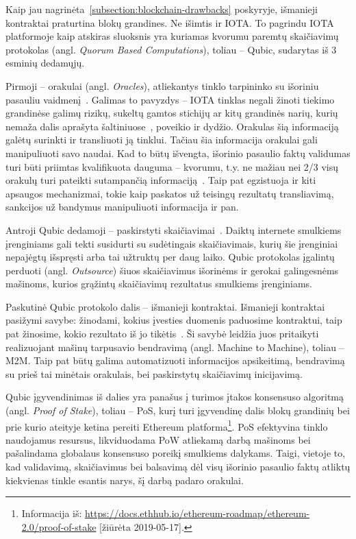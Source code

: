  \label{subsection:dag-qubic}

Kaip jau nagrinėta~\ref{subsection:blockchain-drawbacks} poskyryje, išmanieji kontraktai praturtina blokų grandines. Ne išimtis ir IOTA. To pagrindu IOTA platformoje kaip atskiras sluoksnis yra kuriamas kvorumu paremtų skaičiavimų protokolas (angl. \textit{Quorum Based Computations}), toliau – Qubic, sudarytas iš 3 esminių dedamųjų.

Pirmoji – orakulai (angl. \textit{Oracles}), atliekantys tinklo tarpininko su išoriniu pasauliu vaidmenį~\cite{iota2017oracles}. Galimas to pavyzdys – IOTA tinklas negali žinoti tiekimo grandinėse galimų rizikų, sukeltų gamtos stichijų ar kitų grandinės narių, kurių nemaža dalis aprašyta šaltiniuose~\cite{behdani2012handle, strom2013pwc}, poveikio ir dydžio. Orakulas šią informaciją galėtų surinkti ir transliuoti ją tinklui. Tačiau šia informacija orakulai gali manipuliuoti savo naudai. Kad to būtų išvengta, išorinio pasaulio faktų validumas turi būti priimtas kvalifikuota dauguma – kvorumu, t.y. ne mažiau nei 2/3 visų orakulų turi pateikti sutampančią informaciją~\cite{iota2017oracles}. Taip pat egzistuoja ir kiti apsaugos mechanizmai, tokie kaip paskatos už teisingų rezultatų transliavimą, sankcijos už bandymus manipuliuoti informacija ir pan.

Antroji Qubic dedamoji – paskirstyti skaičiavimai~\cite{iota2017oracles}. Daiktų internete smulkiems įrenginiams gali tekti susidurti su sudėtingais skaičiavimais, kurių šie įrenginiai nepajėgtų išspręsti arba tai užtruktų per daug laiko. Qubic protokolas įgalintų perduoti (angl. \textit{Outsource}) šiuos skaičiavimus išorinėms ir gerokai galingesnėms mašinoms, kurios grąžintų skaičiavimų rezultatus smulkiems įrenginiams.

Paskutinė Qubic protokolo dalis – išmanieji kontraktai. Išmanieji kontraktai pasižymi savybe: žinodami, kokius įvesties duomenis paduosime kontraktui, taip pat žinosime, kokio rezultato iš jo tikėtis~\cite{iota2017oracles}. Ši savybė leidžia juos pritaikyti realizuojant mašinų tarpusavio bendravimą (angl. Machine to Machine), toliau – M2M. Taip pat būtų galima automatizuoti informacijos apsikeitimą, bendravimą su prieš tai minėtais orakulais, bei paskirstytų skaičiavimų inicijavimą.

Qubic įgyvendinimas iš dalies yra panašus į turimos įtakos konsensuso algoritmą (angl. \textit{Proof of Stake}), toliau – PoS, kurį turi įgyvendinę dalis blokų grandinių bei prie kurio ateityje ketina pereiti Ethereum platforma\footnote{Informacija iš: \href{https://docs.ethhub.io/ethereum-roadmap/ethereum-2.0/proof-of-stake}{https://docs.ethhub.io/ethereum-roadmap/ethereum-2.0/proof-of-stake} [žiūrėta 2019-05-17].}. PoS efektyvina tinklo naudojamus resursus, likviduodama PoW atliekamą darbą mašinoms bei pašalindama globalaus konsensuso poreikį smulkiems dalykams. Taigi, vietoje to, kad validavimą, skaičiavimus bei balsavimą dėl visų išorinio pasaulio faktų atliktų kiekvienas tinkle esantis narys, šį darbą padaro orakulai.



